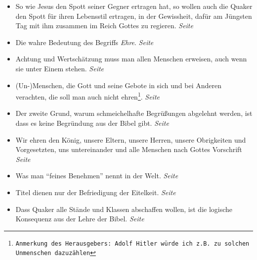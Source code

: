 \begin{itemize}
\begin{itemize}
 \item So wie Jesus den Spott seiner Gegner ertragen hat, so wollen auch die
Quaker den Spott für ihren Lebensstil ertragen, in der Gewissheit, dafür am
Jüngsten Tag mit ihm zusammen im Reich Gottes zu regieren.
 \dotfill \textit{Seite~\pageref{ref:09_10_spott}}\\

 \item Die wahre Bedeutung des Begriffs \textit{Ehre}.
 \dotfill \textit{Seite~\pageref{ref:09_12_ehre}}\\

 \item Achtung und Wertschätzung muss man allen Menschen erweisen, auch wenn sie
unter Einem stehen.
 \dotfill \textit{Seite~\pageref{ref:09_18_ehre}}\\

 \item (Un-)Menschen, die Gott und seine Gebote in sich und bei Anderen
verachten, die soll man auch nicht ehren\footnote{\texttt{Anmerkung des
Herausgebers: Adolf Hitler würde ich z.B. zu solchen Unmenschen dazuzählen}}.
 \dotfill \textit{Seite~\pageref{ref:09_19_ehre}}\\

 \item Der zweite Grund, warum schmeichelhafte Begrüßungen abgelehnt werden, ist
dass es keine Begründung aus der Bibel gibt.
 \dotfill \textit{Seite~\pageref{ref:09_20_zeiter_grund}}\\

 \item Wir ehren den König, unsere Eltern,
unsere Herren, unsere Obrigkeiten
und Vorgesetzten, uns untereinander und alle
Menschen nach Gottes Vorschrift
 \dotfill \textit{Seite~\pageref{ref:09_20_koenig}}\\

 \item Was man "`feines Benehmen"' nennt in der Welt.
 \dotfill \textit{Seite~\pageref{ref:09_26_feines_benemen}}\\

 \item Titel dienen nur der Befriedigung der Eitelkeit.
 \dotfill \textit{Seite~\pageref{ref:09_31_heuchelei}}\\

 \item Dass Quaker alle Stände und Klassen abschaffen wollen, ist die logische
Konsequenz aus der Lehre der Bibel.
 \dotfill \textit{Seite
\pageref{ref:09_35_staende_abschaffen}}\\


\end{itemize}
\end{itemize}
